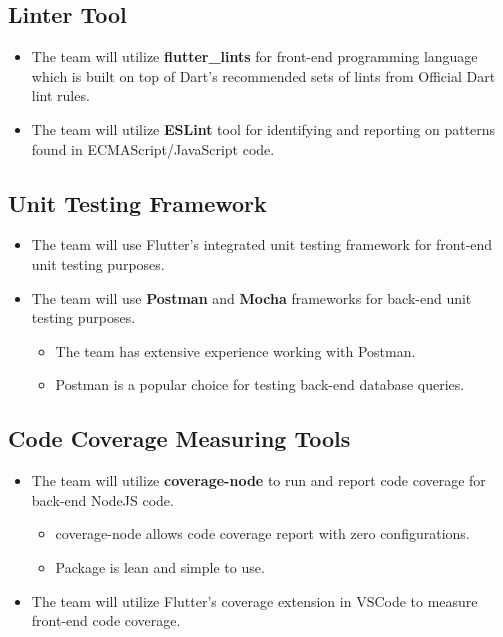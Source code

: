 \documentclass{article}
\begin{document}
\subsection{Linter Tool}
    \begin{itemize}
        \item The team will utilize \textbf{flutter\_lints} for front-end programming language which is built on top of Dart's recommended sets of lints from Official Dart lint rules.
        \item The team will utilize \textbf{ESLint} tool for identifying and reporting on patterns found in ECMAScript/JavaScript code.
    \end{itemize}
\subsection{Unit Testing Framework}
    \begin{itemize}
        \item The team will use Flutter's integrated unit testing framework for front-end unit testing purposes.
        \item The team will use \textbf{Postman} and \textbf{Mocha} frameworks for back-end unit testing purposes.
        \begin{itemize}
            \item The team has extensive experience working with Postman.
            \item Postman is a popular choice for testing back-end database queries.
        \end{itemize}
    \end{itemize}
\subsection{Code Coverage Measuring Tools}
    \begin{itemize}
        \item The team will utilize \textbf{coverage-node} to run and report code coverage for back-end NodeJS code.
        \begin{itemize}
            \item coverage-node allows code coverage report with zero configurations.
            \item Package is lean and simple to use.
        \end{itemize}
        \item The team will utilize Flutter's coverage extension in VSCode to measure front-end code coverage.
    \end{itemize}
\end{document}
